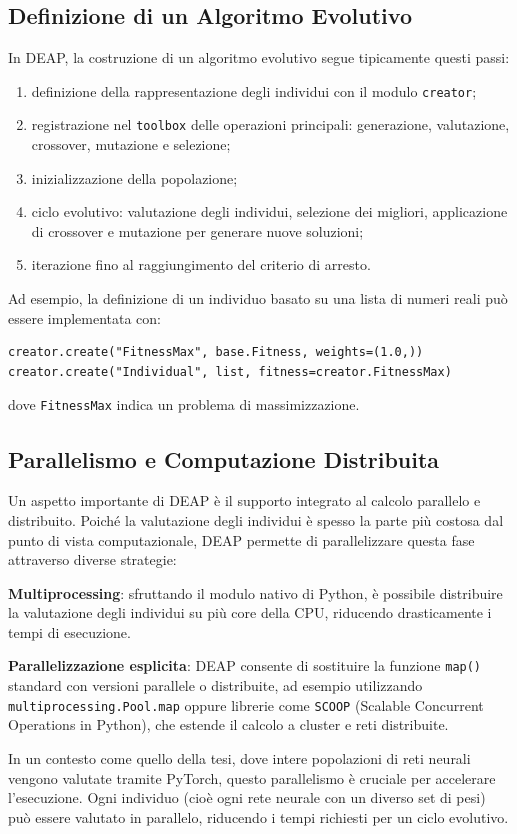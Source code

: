 \subsection{Definizione di un Algoritmo Evolutivo}
In DEAP, la costruzione di un algoritmo evolutivo segue tipicamente questi passi:
\begin{enumerate}
    \item definizione della rappresentazione degli individui con il modulo \texttt{creator};
    \item registrazione nel \texttt{toolbox} delle operazioni principali: generazione, valutazione, crossover, mutazione e selezione;
    \item inizializzazione della popolazione;
    \item ciclo evolutivo: valutazione degli individui, selezione dei migliori, applicazione di crossover e mutazione per generare nuove soluzioni;
    \item iterazione fino al raggiungimento del criterio di arresto.
\end{enumerate}

Ad esempio, la definizione di un individuo basato su una lista di numeri reali può essere implementata con:
\begin{verbatim}
creator.create("FitnessMax", base.Fitness, weights=(1.0,))
creator.create("Individual", list, fitness=creator.FitnessMax)
\end{verbatim}
dove \texttt{FitnessMax} indica un problema di massimizzazione.

\subsection{Parallelismo e Computazione Distribuita}
Un aspetto importante di DEAP è il supporto integrato al calcolo parallelo e distribuito. Poiché la valutazione degli individui è spesso la parte più costosa dal punto di vista computazionale, DEAP permette di parallelizzare questa fase attraverso diverse strategie:
\begin{compactitemize}
    \item \textbf{Multiprocessing}: sfruttando il modulo nativo di Python, è possibile distribuire la valutazione degli individui su più core della CPU, riducendo drasticamente i tempi di esecuzione.
    \item \textbf{Parallelizzazione esplicita}: DEAP consente di sostituire la funzione \texttt{map()} standard con versioni parallele o distribuite, ad esempio utilizzando \texttt{multiprocessing.Pool.map} oppure librerie come \texttt{SCOOP} (Scalable Concurrent Operations in Python), che estende il calcolo a cluster e reti distribuite.
\end{compactitemize}
In un contesto come quello della tesi, dove intere popolazioni di reti neurali vengono valutate tramite PyTorch, questo parallelismo è cruciale per accelerare l'esecuzione. Ogni individuo (cioè ogni rete neurale con un diverso set di pesi) può essere valutato in parallelo, riducendo i tempi richiesti per un ciclo evolutivo.


